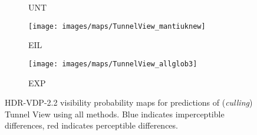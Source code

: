 \documentclass{egpubl}
\begin{document}
\begin{figure*}[htb]
\begin{subfigure}[t]{0.13\linewidth}
        \caption{UNT}
    \end{subfigure}
    \begin{subfigure}[t]{0.13\linewidth}
        \centering
        \texttt{[image: images/maps/TunnelView\_mantiuknew]}
        \caption{EIL}
    \end{subfigure}
    \begin{subfigure}[t]{0.13\linewidth}
        \centering
        \texttt{[image: images/maps/TunnelView\_allglob3]}
        \caption{EXP}
    \end{subfigure}
    \caption{HDR-VDP-2.2 visibility probability maps for predictions of
    (\textit{culling}) Tunnel View using all methods. Blue indicates
    imperceptible differences, red indicates perceptible
    differences.}\label{fig:mapsbad}
\end{figure*}
\end{document}
